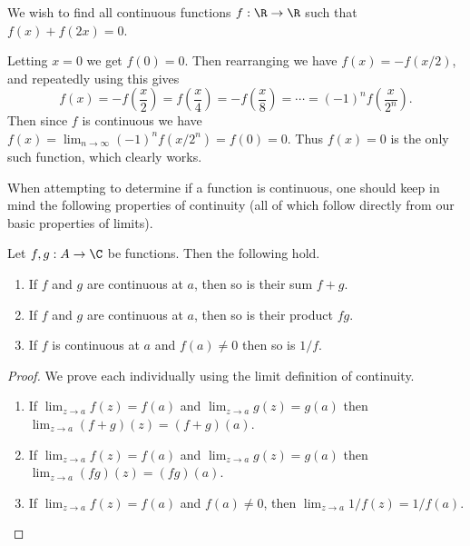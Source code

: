 \begin{example}
	We wish to find all continuous functions $f: \R \rightarrow \R$  such that $f(x) + f(2x) = 0$.

	Letting $x = 0$ we get $f(0) = 0$. Then rearranging we have
	$f(x) = -f(x/2)$, and repeatedly using this gives
	$$
	f(x) = -f\left(\frac{x}{2}\right) = f\left(\frac{x}{4}\right) = -f\left(\frac{x}{8}\right) = \cdots = (-1)^{n}f\left(\frac{x}{2^n}\right).
	$$
	Then since $f$ is continuous we have $f(x) = \lim_{n \to \infty} (-1)^n f(x/2^n) = f(0) = 0$. Thus $f(x) = 0$ is the only such function, which clearly works.
\end{example}


When attempting to determine if a function is continuous, one should keep in mind the following properties of continuity (all of which follow directly from our basic properties of limits).

\begin{proposition}
	Let $f, g: A \rightarrow \C$ be functions. Then the following hold.
	\begin{enumerate}[label=(\roman*)]
		\item If $f$ and $g$ are continuous at $a$, then so is their sum $f + g$.
		\item If $f$ and $g$ are continuous at $a$, then so is their product $fg$.
		\item If $f$ is continuous at $a$ and $f(a) \neq 0$ then so is $1/f$.
	\end{enumerate}
\end{proposition}
\begin{proof}
	We prove each individually using the limit definition of continuity.
	\begin{enumerate}[label=(\roman*)]
		\item If $\displaystyle\lim_{z \to a} f(z) = f(a)$ and $\displaystyle\lim_{z \to a} g(z) = g(a)$ then $\displaystyle\lim_{z \to a} (f+g)(z) = (f+g)(a)$.
		\item If $\displaystyle\lim_{z \to a} f(z) = f(a)$ and $\displaystyle\lim_{z \to a} g(z) = g(a)$ then $\displaystyle\lim_{z \to a} (fg)(z) = (fg)(a)$.
		\item If $\displaystyle\lim_{z \to a} f(z) = f(a)$ and $f(a) \neq 0$, then $\displaystyle\lim_{z \to a} 1/f(z) = 1/f(a)$.
		 \qedhere
	\end{enumerate}
\end{proof}

